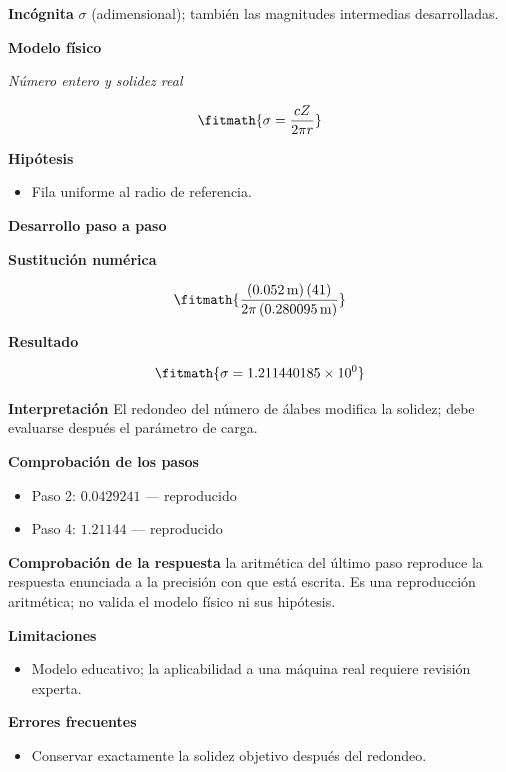 \documentclass[10pt,openany]{book}
\begin{document}
\noindent\textbf{Incógnita}
$\sigma$ (adimensional); también las magnitudes intermedias desarrolladas.

\noindent\textbf{Modelo físico}

\noindent\textit{Número entero y solidez real}

\[
\fitmath{\sigma=\frac{c Z}{2 \pi r}}
\]

\noindent\textbf{Hipótesis}
\begin{itemize}
\item Fila uniforme al radio de referencia.
\end{itemize}

\noindent\textbf{Desarrollo paso a paso}



\noindent\textbf{Sustitución numérica}

\[
\fitmath{\frac{\left(0.052\,\mathrm{m}\right) \left(41\right)}{2 \pi \left(0.280095\,\mathrm{m}\right)}}
\]

\noindent\textbf{Resultado}

\[
\fitmath{\sigma=1.211440185\times10^{0}}
\]

\noindent\textbf{Interpretación}
El redondeo del número de álabes modifica la solidez; debe evaluarse después el parámetro de carga.

\noindent\textbf{Comprobación de los pasos}
\begin{itemize}
\item Paso 2: $0.0429241$ — reproducido
\item Paso 4: $1.21144$ — reproducido
\end{itemize}

\noindent\textbf{Comprobación de la respuesta} la aritmética del último paso reproduce la respuesta enunciada a la precisión con que está escrita. Es una reproducción aritmética; no valida el modelo físico ni sus hipótesis.

\noindent\textbf{Limitaciones}
\begin{itemize}
\item Modelo educativo; la aplicabilidad a una máquina real requiere revisión experta.
\end{itemize}

\noindent\textbf{Errores frecuentes}
\begin{itemize}
\item Conservar exactamente la solidez objetivo después del redondeo.
\end{itemize}
\end{document}
